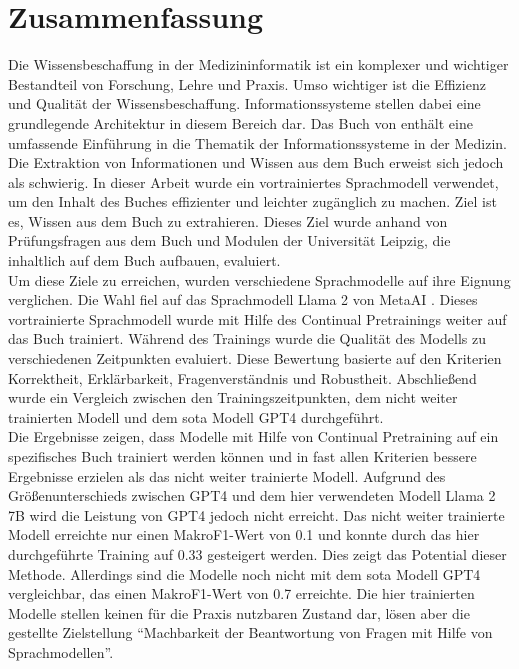 \chapter*{Zusammenfassung}
Die Wissensbeschaffung in der Medizininformatik ist ein komplexer und wichtiger Bestandteil von Forschung, Lehre und Praxis.
Umso wichtiger ist die Effizienz und Qualität der Wissensbeschaffung.
Informationssysteme stellen dabei eine grundlegende Architektur in diesem Bereich dar.
Das Buch  von \citet{bb} enthält eine umfassende Einführung in die Thematik der Informationssysteme in der Medizin.
Die Extraktion von Informationen und Wissen aus dem Buch erweist sich jedoch als schwierig.
In dieser Arbeit wurde ein vortrainiertes Sprachmodell verwendet, um den Inhalt des Buches effizienter und leichter zugänglich zu machen.
Ziel ist es, Wissen aus dem Buch zu extrahieren.
Dieses Ziel wurde anhand von Prüfungsfragen aus dem Buch und Modulen der Universität Leipzig, die inhaltlich auf dem Buch aufbauen, evaluiert.\\

Um diese Ziele zu erreichen, wurden verschiedene Sprachmodelle auf ihre Eignung verglichen.
Die Wahl fiel auf das Sprachmodell Llama 2 von MetaAI \citep{llama2}.
Dieses vortrainierte Sprachmodell wurde mit Hilfe des Continual Pretrainings weiter auf das Buch trainiert.
Während des Trainings wurde die Qualität des Modells zu verschiedenen Zeitpunkten evaluiert.
Diese Bewertung basierte auf den Kriterien Korrektheit, Erklärbarkeit, Fragenverständnis und Robustheit.
Abschließend wurde ein Vergleich zwischen den Trainingszeitpunkten, dem nicht weiter trainierten Modell und dem \ac{sota} Modell GPT4 durchgeführt.\\

Die Ergebnisse zeigen, dass Modelle mit Hilfe von Continual Pretraining auf ein spezifisches Buch trainiert werden können und in fast allen Kriterien bessere Ergebnisse erzielen als das nicht weiter trainierte Modell.
Aufgrund des Größenunterschieds zwischen GPT4 und dem hier verwendeten Modell Llama 2 7B wird die Leistung von GPT4 jedoch nicht erreicht.
Das nicht weiter trainierte Modell erreichte nur einen MakroF1-Wert von \num{0.1} und konnte durch das hier durchgeführte Training auf \num{0.33} gesteigert werden.
Dies zeigt das Potential dieser Methode.
Allerdings sind die Modelle noch nicht mit dem \ac{sota} Modell GPT4 vergleichbar, das einen MakroF1-Wert von \num{0.7} erreichte.
Die hier trainierten Modelle stellen keinen für die Praxis nutzbaren Zustand dar, lösen aber die gestellte Zielstellung \enquote{Machbarkeit der Beantwortung von Fragen mit Hilfe von Sprachmodellen}.\\

